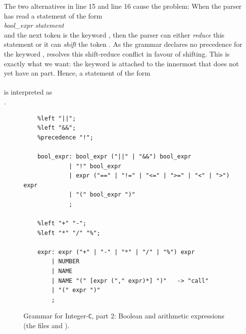 \begin{enumerate}
      The two alternatives in line 15 and line 16 cause the 
      problem:  When the parser has read a statement of the form
      \\[0.2cm]
      \hspace*{1.3cm}
       \textsl{bool\_expr} \mytt{)} \textsl{statement}
      \\[0.2cm]
      and the next token is the keyword , then the parser can either \emph{reduce} this statement or
      it can \emph{shift} the token .  As the grammar declares no precedence for the keyword
      ,  resolves this shift-reduce conflict in favour of shifting.  This is
      exactly what we want:  the keyword  is attached to the innermost
       that does not yet have an  part.  Hence, a statement of the form
      \\[0.2cm]
      \hspace*{1.3cm}
      \\[0.2cm]
      is interpreted as
      \\[0.2cm]
      \hspace*{1.3cm}
      .
\end{enumerate}

\begin{figure}[!ht]
\centering
\begin{verbatim}
    %left "||";
    %left "&&";
    %precedence "!";

    bool_expr: bool_expr ("||" | "&&") bool_expr
             | "!" bool_expr
             | expr ("==" | "!=" | "<=" | ">=" | "<" | ">") expr
             | "(" bool_expr ")"
             ;

    %left "+" "-";
    %left "*" "/" "%";

    expr: expr ("+" | "-" | "*" | "/" | "%") expr
        | NUMBER
        | NAME
        | NAME "(" [expr ("," expr)*] ")"   -> "call"
        | "(" expr ")"
        ;
\end{verbatim}
\vspace*{-0.3cm}
\caption{Grammar for Integer-\texttt{C}, part 2: Boolean and arithmetic expressions (the files
          and ).}
\label{fig:Compiler.ipynb-2}
\end{figure}

